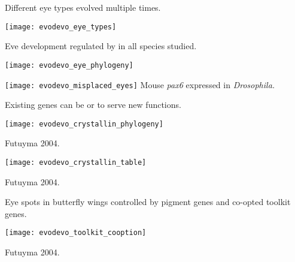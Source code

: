 \documentclass[t]{beamer}
\newcommand{\backskip}{\vspace{-0.5\baselineskip}}
\begin{document}

\begin{frame}{Different eye types evolved multiple times.}

\backskip

\centering

\texttt{[image: evodevo\_eye\_types]}

\end{frame}


\begin{frame}{Eve development regulated by  in all species studied.}

\backskip

\begin{multicols}{2}

\texttt{[image: evodevo\_eye\_phylogeny]}

\columnbreak

\texttt{[image: evodevo\_misplaced\_eyes]}\newline
\footnotesize Mouse \emph{pax6} expressed in \textit{Drosophila.}

\end{multicols}


\end{frame}


\begin{frame}{Existing genes can be  or  to serve new functions.}

\backskip

\texttt{[image: evodevo\_crystallin\_phylogeny]}

\tinyfill Futuyma 2004.

\end{frame}


\begin{frame}

\centering

\texttt{[image: evodevo\_crystallin\_table]}

\tinyfill Futuyma 2004.

\end{frame}


\begin{frame}{Eye spots in butterfly wings controlled by pigment genes and co-opted toolkit genes.}


\texttt{[image: evodevo\_toolkit\_cooption]}

\tinyfill Futuyma 2004.
\end{frame}
\end{document}
